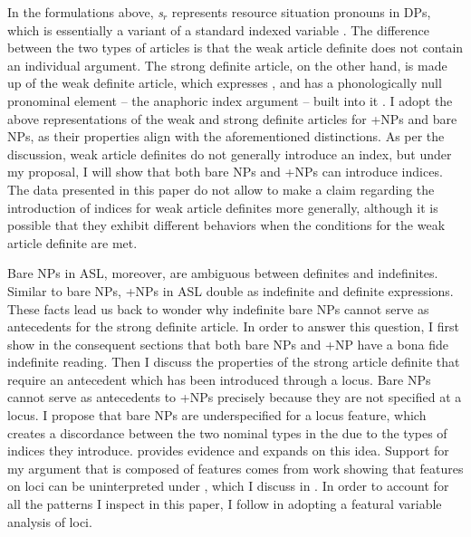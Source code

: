 \documentclass[output=paper,
modfonts
]{langscibook}
\begin{document}
In the formulations above, \textit{s$_r$} represents resource situation pronouns in DPs, which is essentially a variant of a standard indexed variable \citep[95]{Schwarz2009}. The difference between the two types of articles is that the weak article definite does not contain an individual argument. The strong definite article, on the other hand, is made up of the weak definite article, which expresses , and has a phonologically null pronominal element -- the anaphoric index argument -- built into it \citep[258]{Schwarz2009}. I adopt the above representations of the weak and strong definite articles for +NPs and bare NPs, as their properties align with the aforementioned distinctions. As per the discussion, weak article definites do not generally introduce an index, but under my proposal, I will show that both bare NPs and +NPs can introduce indices. The data presented in this paper do not allow to make a claim regarding the introduction of indices for weak article definites more generally, although it is possible that they exhibit different behaviors when the conditions for the weak article definite are met. 


Bare NPs in ASL, moreover, are ambiguous between definites and indefinites. Similar to bare NPs, +NPs in ASL double as indefinite and definite expressions. These facts lead us back to wonder why indefinite bare NPs cannot serve as antecedents for the strong definite article. In order to answer this question, I first show in the consequent sections that both bare NPs and +NP have a bona fide indefinite reading. Then I discuss the properties of the strong article definite that require an antecedent which has been introduced through a locus. Bare NPs cannot serve as antecedents to +NPs precisely because they are not specified at a locus. I propose that bare NPs are underspecified for a locus feature, which creates a discordance between the two nominal types in the  due to the types of indices they introduce.  provides evidence and expands on this idea. Support for my argument that  is composed of features comes from work showing that features on loci can be uninterpreted under  \citep{Kuhn2015}, which I discuss in . In order to account for all the patterns I inspect in this paper, I follow \citet{Schlenker2014} in adopting a featural variable analysis of loci. 
\end{document}
